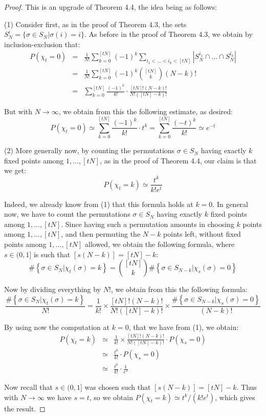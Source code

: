 \documentclass[12pt]{amsbook}
\begin{document}
\begin{proof}
This is an upgrade of Theorem 4.4, the idea being as follows:

\medskip

(1) Consider first, as in the proof of Theorem 4.3, the sets $S_N^i=\{\sigma\in S_N|\sigma(i)=i\}$. As before in the proof of Theorem 4.3, we obtain by inclusion-exclusion that:
\begin{eqnarray*}
P(\chi_t=0)
&=&\frac{1}{N!}\sum_{k=0}^{[tN]}(-1)^k\sum_{i_1<\ldots<i_k<[tN]}|S_N^{i_1}\cap\ldots\cap S_N^{i_k}|\\
&=&\frac{1}{N!}\sum_{k=0}^{[tN]}(-1)^k\binom{[tN]}{k}(N-k)!\\
&=&\sum_{k=0}^{[tN]}\frac{(-1)^k}{k!}\cdot\frac{[tN]!(N-k)!}{N!([tN]-k)!}
\end{eqnarray*}

But with $N\to\infty$, we obtain from this the following estimate, as desired:
$$P(\chi_t=0)
\simeq\sum_{k=0}^{[tN]}\frac{(-1)^k}{k!}\cdot t^k
=\sum_{k=0}^{[tN]}\frac{(-t)^k}{k!}
\simeq e^{-t}$$

(2) More generally now, by counting the permutations $\sigma\in S_N$ having exactly $k$ fixed points among $1,\ldots,[tN]$, as in the proof of Theorem 4.4, our claim is that we get:
$$P(\chi_t=k)\simeq\frac{t^k}{k!e^t}$$

Indeed, we already know from (1) that this formula holds at $k=0$. In general now, we have to count the permutations $\sigma\in S_N$ having exactly $k$ fixed points among $1,\ldots,[tN]$. Since having such a permutation amounts in choosing $k$ points among $1,\ldots,[tN]$, and then permuting the $N-k$ points left, without fixed points among $1,\ldots,[tN]$ allowed, we obtain the following formula, where $s\in(0,1]$ is such that $[s(N-k)]=[tN]-k$:
$$\#\left\{\sigma\in S_N\Big|\chi_t(\sigma)=k\right\}
=\binom{[tN]}{k}\#\left\{\sigma\in S_{N-k}\Big|\chi_s(\sigma)=0\right\}$$

Now by dividing everything by $N!$, we obtain from this the following formula:
$$\frac{\#\left\{\sigma\in S_N\Big|\chi_t(\sigma)=k\right\}}{N!}=\frac{1}{k!}\times\frac{[tN]!(N-k)!}{N!([tN]-k)!}\times\frac{\#\left\{\sigma\in S_{N-k}\Big|\chi_s(\sigma)=0\right\}}{(N-k)!}$$

By using now the computation at $k=0$, that we have from (1), we obtain:
\begin{eqnarray*}
P(\chi_t=k)
&\simeq&\frac{1}{k!}\times\frac{[tN]!(N-k)!}{N!([tN]-k)!}\cdot P(\chi_s=0)\\
&\simeq&\frac{t^k}{k!}\cdot P(\chi_s=0)\\
&\simeq&\frac{t^k}{k!}\cdot\frac{1}{e^s}
\end{eqnarray*}

Now recall that $s\in(0,1]$ was chosen such that $[s(N-k)]=[tN]-k$. Thus with $N\to\infty$ we have $s=t$, so we obtain $P(\chi_t=k)\simeq t^k/(k!e^t)$, which gives the result.
\end{proof}
\end{document}
